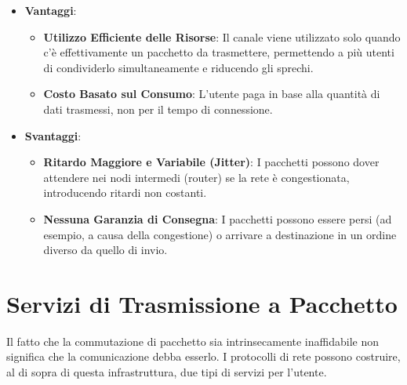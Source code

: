 \begin{itemize}
    \item \textbf{Vantaggi}:
    \begin{itemize}
        \item \textbf{Utilizzo Efficiente delle Risorse}: Il canale viene utilizzato solo quando c'è effettivamente un pacchetto da trasmettere, permettendo a più utenti di condividerlo simultaneamente e riducendo gli sprechi.
        \item \textbf{Costo Basato sul Consumo}: L'utente paga in base alla quantità di dati trasmessi, non per il tempo di connessione.
    \end{itemize}
    \item \textbf{Svantaggi}:
    \begin{itemize}
        \item \textbf{Ritardo Maggiore e Variabile (Jitter)}: I pacchetti possono dover attendere nei nodi intermedi (router) se la rete è congestionata, introducendo ritardi non costanti.
        \item \textbf{Nessuna Garanzia di Consegna}: I pacchetti possono essere persi (ad esempio, a causa della congestione) o arrivare a destinazione in un ordine diverso da quello di invio.
    \end{itemize}
\end{itemize}

\section{Servizi di Trasmissione a Pacchetto}
Il fatto che la commutazione di pacchetto sia intrinsecamente inaffidabile non significa che la comunicazione debba esserlo. I protocolli di rete possono costruire, al di sopra di questa infrastruttura, due tipi di servizi per l'utente.

